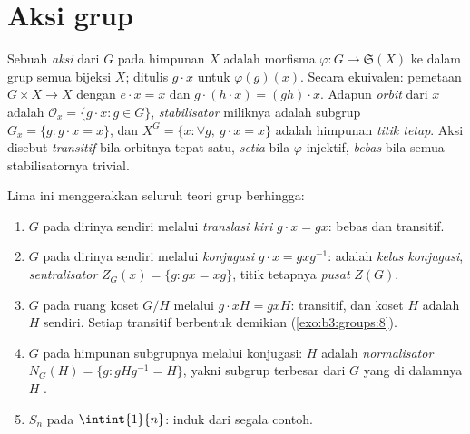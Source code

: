 \section{Aksi grup}

\begin{definition}\label{def:b3:groups:action}
Sebuah \emph{aksi} dari $G$ pada himpunan $X$ adalah
morfisma $\varphi \colon G \to \mathfrak{S}(X)$ ke dalam grup semua
bijeksi $X$; ditulis $g \cdot x$ untuk $\varphi(g)(x)$.
Secara ekuivalen: pemetaan $G \times X \to X$ dengan $e \cdot x = x$ dan $g
\cdot (h \cdot x) = (gh) \cdot x$. Adapun \emph{orbit} dari
$x$ adalah $\mathcal O_x = \{g \cdot x : g \in G\}$,
\emph{stabilisator} miliknya adalah subgrup $G_x = \{g :
g\cdot x = x\}$, dan $X^G = \{x : \forall g,\ g \cdot x = x\}$ adalah
himpunan \emph{titik tetap}. Aksi disebut \emph{transitif} bila
orbitnya tepat satu, \emph{setia} bila $\varphi$
injektif, \emph{bebas} bila semua stabilisatornya trivial.
\end{definition}

\begin{example}\label{ex:b3:groups:actions}
Lima  ini menggerakkan seluruh teori grup berhingga:
\begin{enumerate}
  \item $G$ pada dirinya sendiri melalui \emph{translasi kiri} $g \cdot x = gx$:
        bebas dan transitif.
  \item $G$ pada dirinya sendiri melalui \emph{konjugasi} $g \cdot x = gxg^{-1}$:
         adalah \emph{kelas konjugasi},  \emph{sentralisator}
         $Z_G(x) = \{g : gx = xg\}$, titik
        tetapnya \emph{pusat} $Z(G)$.
  \item $G$ pada ruang koset $G/H$ melalui $g \cdot xH = gxH$:
        transitif, dan  koset $H$ adalah $H$ sendiri.
        Setiap  transitif berbentuk demikian
        (\cref{exo:b3:groups:8}).
  \item $G$ pada himpunan subgrupnya melalui konjugasi: 
        $H$ adalah \emph{normalisator} $N_G(H) =
        \{g : gHg^{-1} = H\}$, yakni subgrup terbesar dari $G$ yang di dalamnya
        $H$ .
  \item $S_n$ pada $\intint{1}{n}$: induk dari segala contoh.
\end{enumerate}
\end{example}

